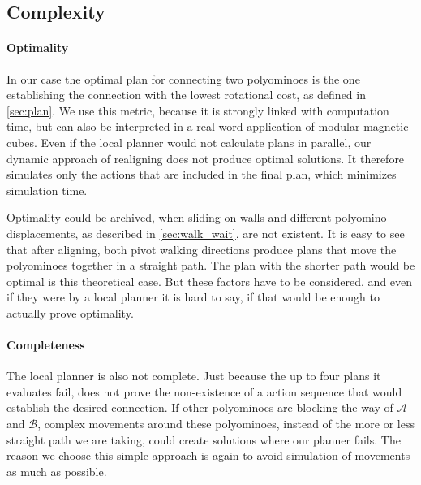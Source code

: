 \subsection{Complexity}
\label{sec:local_complex}

\paragraph{Optimality}

In our case the optimal plan for connecting two polyominoes is the one establishing the connection with the lowest rotational cost, as defined in \autoref{sec:plan}.
We use this metric, because it is strongly linked with computation time, but can also be interpreted in a real word application of modular magnetic cubes.
Even if the local planner would not calculate plans in parallel, our dynamic approach of realigning does not produce optimal solutions.
It therefore simulates only the actions that are included in the final plan, which minimizes simulation time.

Optimality could be archived, when sliding on walls and different polyomino displacements, as described in \autoref{sec:walk_wait}, are not existent.
It is easy to see that after aligning, both pivot walking directions produce plans that move the polyominoes together in a straight path.
The plan with the shorter path would be optimal is this theoretical case.
But these factors have to be considered, and even if they were by a local planner it is hard to say, if that would be enough to actually prove optimality.

\paragraph{Completeness}

The local planner is also not complete.
Just because the up to four plans it evaluates fail, does not prove the non-existence of a action sequence that would establish the desired connection.
If other polyominoes are blocking the way of $\mathcal{A}$ and $\mathcal{B}$, complex movements around these polyominoes, instead of the more or less straight path we are taking, could create solutions where our planner fails.
The reason we choose this simple approach is again to avoid simulation of movements as much as possible. 




